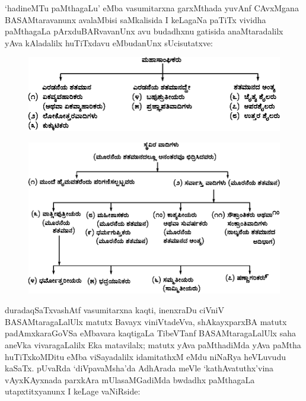 `hadineMTu paMthagaLu' eMba vasumitarxna garxMthada yuvAnf CAvxMgana BASAMtaravanunx avalaMbisi saMkalisida I keLagaNa paTiTx vividha paMthagaLa pArxduBARvavanUnx avu budadhxnu gatisida anaMtaradalilx yAva kAladalilx huTiTxdavu eMbudanUnx sUcisutatxve:
{}
\begin{figure}[h]
\centering
\includegraphics[scale=.95]{figures/fig1.eps}
\end{figure}
\begin{figure}[h]
\centering
\includegraphics[scale=.87]{figures/fig2.eps}
\end{figure}

\newpage

duradaqSaTxvashAtf vasumitarxna kaqti, inenxraDu ciVniV BASAMtaragaLalUlx matutx Bavayx viniVtadeVva, shAkayxparxBA matutx padAmxkaraGoVSa eMbavara kaqtigaLa TibeVTanf BASAMtaragaLalUlx saha aneVka vivaragaLalilx Eka matavilalx; matutx yAva paMthadiMda yAva paMtha huTiTxkoMDitu eMba viSayadalilx idamitathxM eMdu niNaRya heVLuvudu kaSaTx. pUvaRda `diVpavaMsha'da AdhArada meVle `kathAvatuthx'vina vAyxKAyxnada parxkAra mUlasaMGadiMda bwdadhx paMthagaLa utapxtitxyanunx I keLage vaNiRside:

